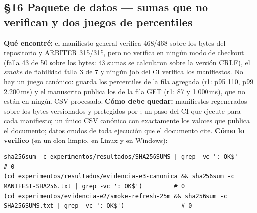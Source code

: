 \subsection*{\S16 Paquete de datos --- sumas que no verifican y dos juegos de percentiles}
\textbf{Qu\'e encontr\'e:} el manifiesto general verifica 468/468 sobre los bytes del repositorio y ARBITER 315/315, pero  no verifica en ning\'un modo de checkout (falla 43 de 50 sobre los bytes: 43 sumas se calcularon sobre la versi\'on CRLF), el \emph{smoke} de fiabilidad falla 3 de 7 y ning\'un job del CI verifica los manifiestos. No hay un juego can\'onico:  guarda los percentiles de la fila agregada (r1: p95 110, p99 2.200\,ms) y el manuscrito publica los de la fila GET (r1: 87 y 1.000\,ms), que no est\'an en ning\'un CSV procesado. \textbf{C\'omo debe quedar:} manifiestos regenerados sobre los bytes versionados y protegidos por ; un paso del CI que ejecute  para cada manifiesto; un \'unico CSV can\'onico con exactamente los valores que publica el documento; datos crudos de toda ejecuci\'on que el documento cite. \textbf{C\'omo lo verifico} (en un clon limpio, en Linux y en Windows):\begin{verbatim}
sha256sum -c experimentos/resultados/SHA256SUMS | grep -vc ': OK$'                                              # 0
(cd experimentos/resultados/evidencia-e3-canonica && sha256sum -c MANIFEST-SHA256.txt | grep -vc ': OK$')         # 0
(cd experimentos/evidencia-e2/smoke-refresh-25m && sha256sum -c SHA256SUMS.txt | grep -vc ': OK$')                # 0
\end{verbatim}

